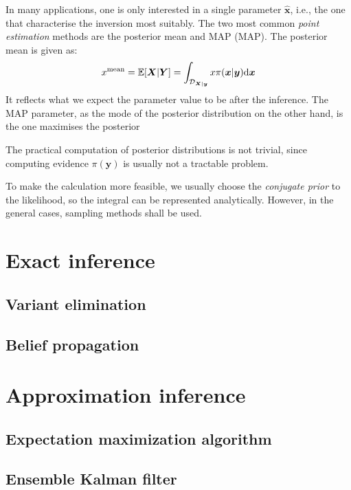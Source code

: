 In many applications, one is only interested in a single parameter $\hat{\boldsymbol{x}}$, i.e., the one that characterise the inversion most suitably. The two most common \textit{point estimation} methods are the posterior mean and \acrlong{MAP} (\acrshort{MAP}). The posterior mean is given as:
\begin{equation}
    \label{eq: posterior mean}
    x^{\rm{mean}} = \mathbb{E}[\boldsymbol{X}|\boldsymbol{Y}] = \int_{\mathcal{D}_{\boldsymbol{X}|\boldsymbol{y}}} 
    x \pi(\boldsymbol{x}|\boldsymbol{y}) {\rm{d}} \boldsymbol{x}    
\end{equation}
It reflects what we expect the parameter value to be after the inference. The \acrshort{MAP} parameter, as the mode of the posterior distribution on the other hand, is the one maximises the posterior




The practical computation of posterior distributions is not trivial, since computing evidence $\pi(\boldsymbol{y})$ is usually not a tractable problem. 


To make the calculation more feasible, we usually choose the \textit{conjugate prior} \citep{gelman1995} to the likelihood, so the integral can be represented analytically. However, in the general cases, sampling methods shall be used.

\section{Exact inference}
\subsection{Variant elimination}
\subsection{Belief propagation}

\section{Approximation inference}

\subsection{Expectation maximization algorithm}

\subsection{Ensemble Kalman filter}
